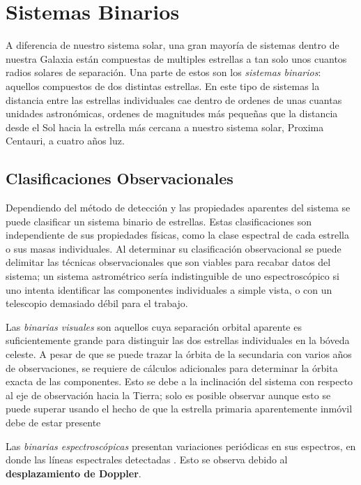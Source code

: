 \section{Sistemas Binarios}

A diferencia de nuestro sistema solar, una gran mayoría de sistemas dentro de
nuestra Galaxia están compuestas de multiples estrellas a tan solo unos cuantos
radios solares de separación. Una parte de estos son los \textit{sistemas
binarios}: aquellos compuestos de dos distintas estrellas. En este tipo de
sistemas la distancia entre las estrellas individuales cae dentro de ordenes de
unas cuantas unidades astronómicas, ordenes de magnitudes más pequeñas que la
distancia desde el Sol hacia la estrella más cercana a nuestro sistema solar,
Proxima Centauri, a cuatro años luz. 

\subsection{Clasificaciones Observacionales}

Dependiendo del método de detección y las propiedades aparentes del sistema se puede clasificar un sistema binario de estrellas. Estas clasificaciones son independiente de sus propiedades físicas, como la clase espectral de cada estrella o sus masas individuales. Al determinar su clasificación observacional se puede delimitar las técnicas observacionales que son viables para recabar datos del sistema; un sistema astrométrico sería indistinguible de uno espectroscópico si uno intenta identificar las componentes individuales a simple vista, o con un telescopio demasiado débil para el trabajo.

Las \textit{binarias visuales} son aquellos cuya separación orbital aparente es suficientemente grande para distinguir las dos estrellas individuales en la bóveda celeste. A pesar de que se puede trazar la órbita de la secundaria con varios años de observaciones, se requiere de cálculos adicionales para determinar la órbita exacta de las componentes. Esto se debe a la inclinación del sistema con respecto al eje de observación hacia la Tierra; solo es posible observar  \citet{fundamentalAstronomy::chapter10_binaryStars} aunque esto se puede superar usando el hecho de que la estrella primaria aparentemente inmóvil debe de estar presente 

Las \textit{binarias espectroscópicas} presentan variaciones periódicas en sus espectros, en donde las líneas espectrales detectadas  \citet{astronomyPhysicalPerspective::chapter5_binaryStars}. Esto se observa debido al \textbf{desplazamiento de Doppler}. 


